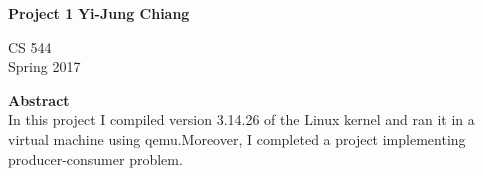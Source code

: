 \documentclass[10pt,conference,draftclsnofoot,onecolumn]{IEEEtran}
\begin{document}
\begin{titlepage}
    \begin{center}
        \vspace*{3.5cm}
        \textbf{Project 1}
        \vspace{0.5cm}
        \textbf{Yi-Jung Chiang}
        \vspace{0.8cm}

        CS 544\\
        Spring 2017\\

        \vspace{1cm}

        \textbf{Abstract}\\

        \vspace{0.5cm}
        In this project I compiled version 3.14.26 of the Linux kernel and ran it in a virtual machine using qemu.Moreover, I completed a
        project implementing producer-consumer problem.
        \vfill
    \end{center}
\end{titlepage}

\newpage
\end{document}
